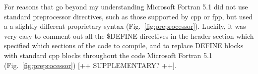 For reasons that go beyond my understanding Microsoft Fortran 5.1 did not use standard preprocessor directives, such as those supported by \textsf{cpp} or \textsf{fpp}, \cite{Boyanski:1992} but used a a slightly different proprietary syntax (Fig.~\ref{fig:preprocessor}). 
Luckily, it was very easy to comment out all the \textsf{\$DEFINE} directives in the header section which specified which sections of the code to compile, and to replace \textsf{DEFINE} blocks with standard \textsf{cpp} blocks throughout the code Microsoft Fortran 5.1 (Fig.~\ref{fig:preprocessor}) [++ SUPPLEMENTARY? ++]. 

%
%
%
%
%
%
%
%

